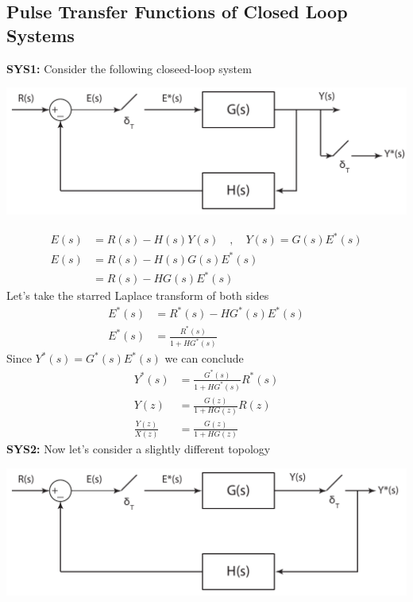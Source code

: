 \documentclass[twoside]{article}
\begin{document}
\subsection*{Pulse Transfer Functions of Closed Loop Systems}

\textbf{SYS1:} Consider the following closeed-loop system
%
    \begin{center}
\begin{minipage}[h]{0.8\linewidth}
    \begin{center}
      \includegraphics[width=\textwidth]{closed}
    \end{center}
\end{minipage}
    \end{center}
%
\begin{align*}
E(s) &= R(s) - H(s) Y(s) \quad , \quad Y(s) = G(s) E^*(s) \\
E(s) &= R(s) - H(s) G(s) E^*(s) \\
       &= R(s) - HG(s) E^*(s)  
\end{align*}
%
Let's take the starred Laplace transform of both sides
\begin{align*}
E^*(s) &= R^*(s) - HG^*(s) E^*(s)  
\\
E^*(s) &= \frac{R^*(s)}{1 + HG^*(s)}
\end{align*}
%
Since $Y^*(s) = G^*(s) E^*(s)$ we can conclude
%
\begin{align*}
Y^*(s) &= \frac{G^*(s)}{1 + HG^*(s)} R^*(s)\\
Y(z) &= \frac{G(z)}{1 + HG(z)} R(z) \\
\frac{Y(z)}{X(z)} &=  \frac{G(z)}{1 + HG(z)}
\end{align*}
%
\textbf{SYS2:} Now let's consider a slightly different topology
%
    \begin{center}
\begin{minipage}[h]{0.8\linewidth}
    \begin{center}
      \includegraphics[width=\textwidth]{closed2}
    \end{center}
\end{minipage}
    \end{center}
\end{document}
